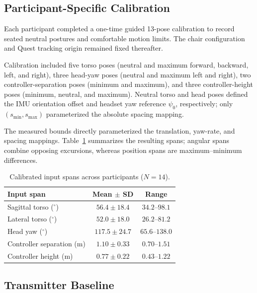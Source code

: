 \documentclass[a4paper,10pt,conference]{ieeeconf}
\begin{document}
\subsection{Participant-Specific Calibration}
\label{sec:calibration}
Each participant completed a one-time guided 13-pose calibration to record
seated neutral postures and comfortable motion limits. The chair configuration and Quest tracking origin remained fixed thereafter.

Calibration included five torso poses (neutral and maximum forward, backward,
left, and right), three head-yaw poses (neutral and maximum left and right),
two controller-separation poses (minimum and maximum), and three
controller-height poses (minimum, neutral, and maximum). Neutral torso and head
poses defined the IMU orientation offset and headset yaw reference $\psi_0$,
respectively; only $(s_{\min},s_{\max})$ parameterized the absolute spacing
mapping.

The measured bounds directly parameterized the translation, yaw-rate, and
spacing mappings.
Table~\ref{tab:calibration_summary} summarizes the resulting spans; angular
spans combine opposing excursions, whereas position spans are
maximum--minimum differences.

\begin{table}[b]
\centering
\caption{Calibrated input spans across participants ($N=14$).}
\label{tab:calibration_summary}
\footnotesize
\setlength{\tabcolsep}{3.5pt}
\begin{tabular}{@{}lcc@{}}
\toprule
Input span & Mean $\pm$ SD & Range \\
\midrule
Sagittal torso ($^\circ$)       & $56.4 \pm 18.4$  & $34.2$--$98.1$ \\
Lateral torso ($^\circ$)        & $52.0 \pm 18.0$  & $26.2$--$81.2$ \\
Head yaw ($^\circ$)             & $117.5 \pm 24.7$ & $65.6$--$138.0$ \\
Controller separation (m)       & $1.10 \pm 0.33$  & $0.70$--$1.51$ \\
Controller height (m)           & $0.77 \pm 0.22$  & $0.43$--$1.22$ \\
\bottomrule
\end{tabular}
\end{table}

\subsection{Transmitter Baseline}
\label{sec:transmitter}
\end{document}
